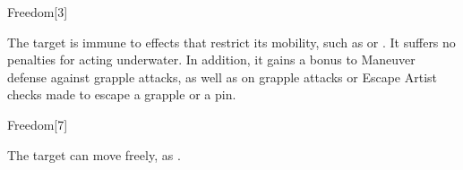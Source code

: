 \begin{spellsection}{Freedom}[3]
    \begin{spellheader}
    \end{spellheader}
    \begin{spellcontent}
        \begin{spelltargetinginfo}
        \end{spelltargetinginfo}
        \begin{spelleffects}
            \spelleffect The target is immune to effects that restrict its mobility, such as  or . It suffers no penalties for acting underwater. In addition, it gains a  bonus to Maneuver defense against grapple attacks, as well as on grapple attacks or Escape Artist checks made to escape a grapple or a pin.
            \spelldur \durshort
        \end{spelleffects}
    \end{spellcontent}
    \begin{spellfooter}
        \miscastrandom
    \end{spellfooter}
\end{spellsection}

\begin{spellsection}[Mass]{Freedom}[7]
    \begin{spellheader}
    \end{spellheader}
    \begin{spellcontent}
        \begin{spelltargetinginfo}
        \end{spelltargetinginfo}
        \begin{spelleffects}
            \spelleffect The target can move freely, as .
            \spelldur \durshort
        \end{spelleffects}
    \end{spellcontent}
    \begin{spellfooter}
        \miscastexplode
    \end{spellfooter}
\end{spellsection}



